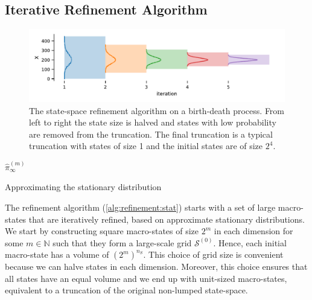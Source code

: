 \subsection{Iterative Refinement Algorithm}\label{sec:statagg:alg}
\begin{figure}[t]
  \centering
  \includegraphics[width=\textwidth]{gfx/bd_truncs.pdf}
  \caption[State-space refinement algorithm]{The state-space
    refinement algorithm on a birth-death process. From left to right
    the state size is halved and states with low probability are
    removed from the truncation. The final truncation is a typical
  truncation with states of size 1 and the initial states are of size $2^4$.}
  \label{fig:refinement_alg}
\end{figure}

\begin{algorithm}
  \Return ${\hat\pi}^{(m)}_{\infty}$\;
  \caption{Approximating the stationary distribution }
  \label{alg:refinement:stat}
\end{algorithm}
The refinement algorithm (\autoref{alg:refinement:stat}) starts with
a set of large macro-states
that are iteratively refined, based on approximate stationary distributions.
We start by constructing square macro-states of size
$2^m$ in each dimension for some $m\in\mathbb{N}$ such that they form
a large-scale grid $\mathcal{S}^{(0)}$.
Hence, each initial macro-state has a volume of ${\left(2^m\right)}^{n_S}$.
This choice of grid size is convenient because we can halve states
in each dimension.
Moreover, this choice ensures that all states have an equal volume
and we end up with unit-sized macro-states,
equivalent to a truncation of the original non-lumped state-space.

